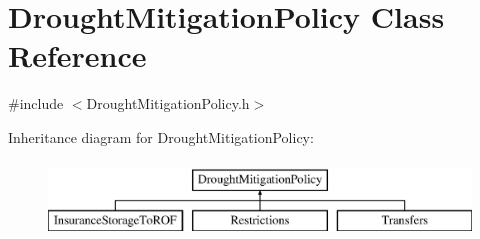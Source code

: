 \hypertarget{classDroughtMitigationPolicy}{}\section{Drought\+Mitigation\+Policy Class Reference}
\label{classDroughtMitigationPolicy}


{\ttfamily \#include $<$Drought\+Mitigation\+Policy.\+h$>$}

Inheritance diagram for Drought\+Mitigation\+Policy\+:\begin{figure}[H]
\begin{center}
\leavevmode
\includegraphics[height=2.000000cm]{classDroughtMitigationPolicy}
\end{center}
\end{figure}
